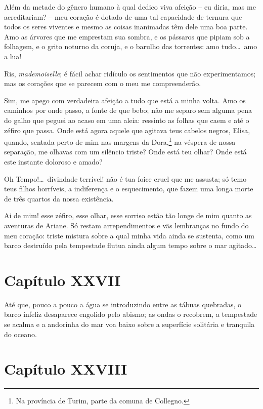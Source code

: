   Além da metade do gênero humano à qual dedico viva afeição -- eu
diria, mas me acreditariam? -- meu coração é dotado de uma tal
capacidade de ternura que todos os seres viventes e mesmo as coisas
inanimadas têm dele uma boa parte. Amo as árvores que me emprestam sua
sombra, e os pássaros que pipiam sob a folhagem, e o grito noturno da
coruja, e o barulho das torrentes: amo tudo\ldots\ amo a lua!

 Ris, \textit{mademoiselle}; é fácil achar ridículo os sentimentos que
não experimentamos; mas os corações que se parecem com o meu me
compreenderão.

 Sim, me apego com verdadeira afeição a tudo que está a minha volta. Amo
os caminhos por onde passo, a fonte de que bebo; não me separo sem
alguma pena do galho que peguei ao acaso em uma aleia: ressinto as
folhas que caem e até o zéfiro que passa. Onde está agora aquele que
agitava teus cabelos negros, Elisa, quando, sentada perto de mim nas
margens da Dora,\footnote{ Na província de Turim, parte da comuna de
Collegno.} na véspera de nossa separação, me olhavas com um silêncio
triste? Onde está teu olhar? Onde está este instante doloroso e amado?

 Oh Tempo!\ldots\ divindade terrível! não é tua foice cruel que me assusta;
só temo teus filhos horríveis, a indiferença e o esquecimento, que
fazem uma longa morte de três quartos da nossa existência. 

 Ai de mim! esse zéfiro, esse olhar, esse sorriso estão tão longe de mim
quanto as aventuras de Ariane. Só restam arrependimentos e vãs
lembranças no fundo do meu coração: triste mistura sobre a qual minha
vida ainda se sustenta, como um barco destruído pela tempestade flutua
ainda algum tempo sobre o mar agitado\ldots

\section*{Capítulo XXVII}

 Até que, pouco a pouco a água se introduzindo entre as tábuas
quebradas, o barco infeliz desaparece engolido pelo abismo; as ondas o
recobrem, a tempestade se acalma e a andorinha do mar voa baixo sobre a
superfície solitária e tranquila do oceano.

\section*{Capítulo XXVIII}

